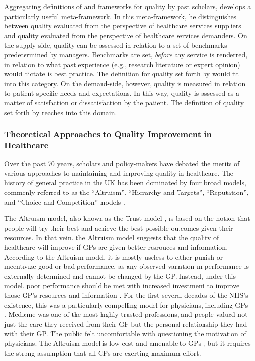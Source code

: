\documentclass[12pt]{article}
\begin{document}
Aggregating definitions of and frameworks for quality by past scholars, \citet{mohammadHealthcareServiceQuality2013} develops a particularly useful meta-framework. In this meta-framework, he distinguishes between quality evaluated from the perspective of healthcare services suppliers and quality evaluated from the perspective of healthcare services demanders. On the supply-side, quality can be assessed in relation to a set of benchmarks predetermined by managers. Benchmarks are set, \emph{before} any service is renderred, in relation to what past experience (e.g., research literature or expert opinion) would dictate is best practice. The definition for quality set forth by \citet{lohrMedicareStrategyQuality1990} would fit into this category. On the demand-side, however, quality is measured in relation to patient-specific needs and expectations. In this way, quality is assessed as a matter of satisfaction or dissatisfaction by the patient. The definition of quality set forth by \citet{ovretveitHealthServiceQuality1992} reaches into this domain.

\subsubsection{Theoretical Approaches to Quality Improvement in Healthcare}
\label{sec:TheoreticalApproachesHealthcareQuality}

Over the past 70 years, scholars and policy-makers have debated the merits of various approaches to maintaining and improving quality in healthcare. The history of general practice in the UK has been dominated by four broad models, commonly referred to as the ``Altruism'', ``Hierarchy and Targets'', ``Reputation'', and ``Choice and Competition'' models \citep{bevanModelsGovernancePublic2013}.

The Altruism model, also known as the Trust model \citep{legrandOtherInvisibleHand2007}, is based on the notion that people will try their best and achieve the best possible outcomes given their resources. In that vein, the Altruism model suggests that the quality of healthcare will improve if GPs are given better resrouces and information. According to the Altruism model, it is mostly useless to either punish or incentivize good or bad performance, as any observed variation in performance is externally determined and cannot be changed by the GP. Instead, under this model, poor performance should be met with increased investment to improve those GP's resources and information \citep{powellMedicinePolitics19751976}. For the first several decades of the NHS's existence, this was a particularly compelling model for physicians, including GPs \citep{bevanPerformanceMeasurementKnights2010}. Medicine was one of the most highly-trusted professions, and people valued not just the care they received from their GP but the personal relationship they had with their GP. The public felt uncomfortable with questioning the motivation of physicians. The Altruism model is low-cost and amenable to GPs \citep{legrandOtherInvisibleHand2007}, but it requires the strong assumption that all GPs are exerting maximum effort.
\end{document}

